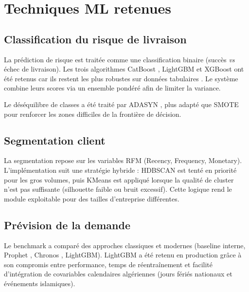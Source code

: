 \documentclass[12pt,a4paper]{report}
\begin{document}
\section{Techniques ML retenues}

\subsection{Classification du risque de livraison}

La pr\'{e}diction de risque est trait\'{e}e comme une classification binaire (succ\`{e}s \textit{vs} \'{e}chec de livraison). Les trois algorithmes CatBoost \cite{prokhorenkova2018catboost}, LightGBM \cite{ke2017lightgbm} et XGBoost \cite{chen2016xgboost} ont \'{e}t\'{e} retenus car ils restent les plus robustes sur donn\'{e}es tabulaires \cite{grinsztajn2022tree}. Le syst\`{e}me combine leurs scores via un ensemble pond\'{e}r\'{e} afin de limiter la variance.

Le d\'{e}s\'{e}quilibre de classes a \'{e}t\'{e} trait\'{e} par ADASYN \cite{he2008adasyn}, plus adapt\'{e} que SMOTE \cite{chawla2002smote} pour renforcer les zones difficiles de la fronti\`{e}re de d\'{e}cision.

\subsection{Segmentation client}

La segmentation repose sur les variables RFM (Recency, Frequency, Monetary). L'impl\'{e}mentation suit une strat\'{e}gie hybride : HDBSCAN \cite{mcinnes2017hdbscan} est tent\'{e} en priorit\'{e} pour les gros volumes, puis KMeans est appliqu\'{e} lorsque la qualit\'{e} de cluster n'est pas suffisante (silhouette faible ou bruit excessif). Cette logique rend le module exploitable pour des tailles d'entreprise diff\'{e}rentes.

\subsection{Pr\'{e}vision de la demande}

Le benchmark a compar\'{e} des approches classiques et modernes (baseline interne, Prophet \cite{taylor2018forecasting}, Chronos \cite{ansari2024chronos}, LightGBM). LightGBM a \'{e}t\'{e} retenu en production gr\^{a}ce \`{a} son compromis entre performance, temps de r\'{e}entra\^{i}nement et facilit\'{e} d'int\'{e}gration de covariables calendaires alg\'{e}riennes (jours f\'{e}ri\'{e}s nationaux et \'{e}v\'{e}nements islamiques).
\end{document}
